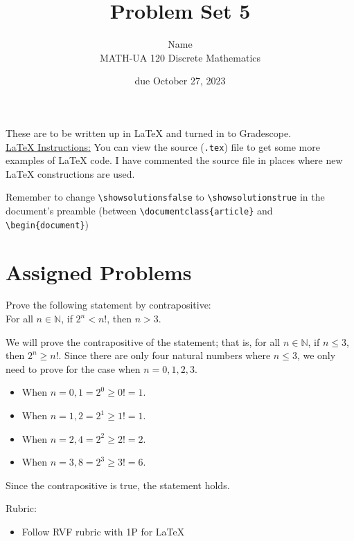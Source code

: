 \documentclass{article}
\title{Problem Set 5}
\author{%
    Name
\\  MATH-UA 120 Discrete Mathematics
}
\date{due October 27, 2023}
\newif\ifshowsolutions
\newcommand{\danger}{\marginpar[\hfill\dbend]{\dbend\hfill}}
\theoremstyle{definition}
\begin{document}
\maketitle



These are to be written up in \LaTeX{} and turned in to Gradescope.\\



\ifshowsolutions
    \SetupExSheets{solution/print=true}
\else
    \danger
 \underline{ \LaTeX{}  Instructions:}  You can view the source (\texttt{.tex}) file to get some more examples of \LaTeX{} code.  I have commented the source file in places where new \LaTeX{} constructions are used.
  
  Remember to change \verb|\showsolutionsfalse| to \verb|\showsolutionstrue|
    in the document's preamble 
    (between \verb|\documentclass{article}| and \verb|\begin{document}|)
\fi

\section*{Assigned Problems}

\begin{question}
    Prove the following statement by contrapositive: \\
    For all $n\in \mathbb{N}$, if $2^n<n!$, then $n>3$.
\end{question}
\begin{solution}
We will prove the contrapositive of the statement; that is, for all $n\in \mathbb{N}$, if $n\leq 3$, then $2^n\geq n!$. Since there are only four natural numbers where $n\leq 3$, we only need to prove for the case when $n=0, 1, 2, 3$.
\begin{itemize}
\item When $n=0, 1 = 2^0 \geq 0!=1.$
\item When $n=1, 2 = 2^1 \geq 1!=1.$
\item When $n=2, 4 = 2^2 \geq 2!=2.$
\item When $n=3, 8 = 2^3 \geq 3!=6.$
\end{itemize}
Since the contrapositive is true, the statement holds.

{\color{red} Rubric:
\begin{itemize}
\item Follow RVF rubric with 1P for \LaTeX
\end{itemize}}
\end{solution}
\end{document}

